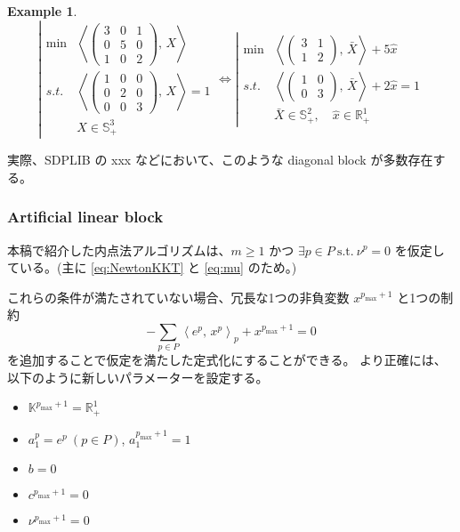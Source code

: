 \documentclass{jsarticle}
\newtheorem{example}{Example}
\newcommand{\inprod}[2]{\left\langle #1, \, #2 \right\rangle}
\begin{document}
\begin{example}
\begin{equation*}
    \left|
    \begin{array}{cl}
        \min & \inprod{\begin{pmatrix}
            3 & 0 & 1 \\
            0 & 5 & 0 \\
            1 & 0 & 2
        \end{pmatrix}}{X} \\
        s.t. 
        & \inprod{\begin{pmatrix}
            1 & 0 & 0 \\ 
            0 & 2 & 0 \\ 
            0 & 0 & 3
        \end{pmatrix}}{X} = 1 \\
        & X\in \mathbb{S}^3_+ 
    \end{array}
    \right.
    \Longleftrightarrow
    \left|
    \begin{array}{cl}
        \min & \inprod{\begin{pmatrix}
            3 & 1 \\
            1 & 2
        \end{pmatrix}}{\bar{X}} + 5\hat{x} \\
        s.t. 
        & \inprod{\begin{pmatrix}
            1 & 0 \\ 0 & 3
        \end{pmatrix}}{\bar{X}} + 2\hat{x} = 1 \\
        & \bar{X}\in \mathbb{S}^2_+, \quad \hat{x} \in \mathbb{R}^1_+
    \end{array}
    \right.
\end{equation*}
\end{example}
実際、SDPLIB の xxx などにおいて、このような diagonal block が多数存在する。

\subsubsection{Artificial linear block}

本稿で紹介した内点法アルゴリズムは、$m \geq 1$ かつ $\exists p\in P ~ \text{s.t.} ~ \nu^p=0$ を仮定している。(主に \eqref{eq:NewtonKKT} と \eqref{eq:mu} のため。)


これらの条件が満たされていない場合、冗長な1つの非負変数 $x^{p_{\max} + 1}$ と1つの制約
\[
  -\sum_{p\in P} \inprod{e^p}{x^p}_p + x^{p_{\max} + 1} = 0
\]
を追加することで仮定を満たした定式化にすることができる。
より正確には、以下のように新しいパラメーターを設定する。
\begin{itemize}
    \item $\mathbb{K}^{p_{\max} + 1} = \mathbb{R}^1_+$
    \item $a^{p}_1=e^p ~ (p \in P)$, $a^{p_{\max} + 1}_1 = 1$
    \item $b = 0$
    \item $c^{p_{\max} +1}=0$
    \item $\nu^{p_{\max} + 1} = 0$
\end{itemize}
\end{document}
